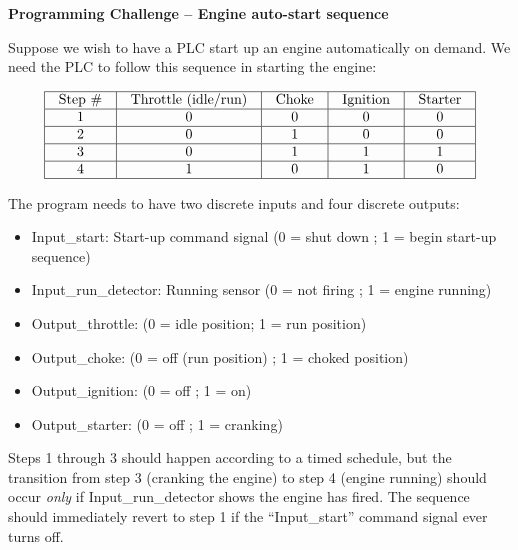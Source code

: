 

\noindent
{\bf Programming Challenge -- Engine auto-start sequence}

\vskip 10pt

Suppose we wish to have a PLC start up an engine automatically on demand.  We need the PLC to follow this sequence in starting the engine:


$$\vbox{\offinterlineskip
\halign{\strut
\vrule \quad\hfil # \ \hfil & 
\vrule \quad\hfil # \ \hfil & 
\vrule \quad\hfil # \ \hfil & 
\vrule \quad\hfil # \ \hfil & 
\vrule \quad\hfil # \ \hfil \vrule \cr
\noalign{\hrule}
%
Step \# & Throttle (idle/run) & Choke & Ignition & Starter \cr
%
\noalign{\hrule}
%
1 & 0 & 0 & 0 & 0 \cr
%
\noalign{\hrule}
%
2 & 0 & 1 & 0 & 0 \cr
%
\noalign{\hrule}
%
3 & 0 & 1 & 1 & 1 \cr
%
\noalign{\hrule}
%
4 & 1 & 0 & 1 & 0 \cr
%
\noalign{\hrule}
} %
}$$ %

The program needs to have two discrete inputs and four discrete outputs:

\begin{itemize}
\item{} Input\_start: Start-up command signal (0 = shut down ; 1 = begin start-up sequence)
\item{} Input\_run\_detector: Running sensor (0 = not firing ; 1 = engine running)
\vskip 5pt
\item{} Output\_throttle: (0 = idle position; 1 = run position)
\item{} Output\_choke: (0 = off (run position) ; 1 = choked position)
\item{} Output\_ignition: (0 = off ; 1 = on)
\item{} Output\_starter: (0 = off ; 1 = cranking)
\end{itemize}

Steps 1 through 3 should happen according to a timed schedule, but the transition from step 3 (cranking the engine) to step 4 (engine running) should occur {\it only} if Input\_run\_detector shows the engine has fired.  The sequence should immediately revert to step 1 if the ``Input\_start'' command signal ever turns off.


